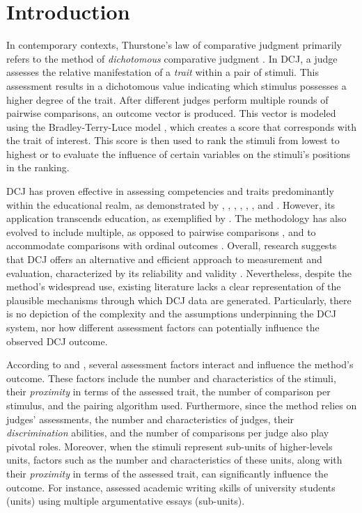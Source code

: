 \documentclass[
  authoryear,
  preprint,
  1p]{elsarticle}
\begin{document}
\section{Introduction}\label{sec-introduction}

In contemporary contexts, Thurstone's law of comparative judgment
\citeyearpar{Thurstone_1927} primarily refers to the method of
\emph{dichotomous} comparative judgment
\citep[DCJ,][]{Pollitt_2012a, Pollitt_2012b}. In DCJ, a judge assesses
the relative manifestation of a \emph{trait} within a pair of stimuli.
This assessment results in a dichotomous value indicating which stimulus
possesses a higher degree of the trait. After different judges perform
multiple rounds of pairwise comparisons, an outcome vector is produced.
This vector is modeled using the Bradley-Terry-Luce model
\citep[BTL,][]{Bradley_et_al_1952, Luce_1959}, which creates a score
that corresponds with the trait of interest. This score is then used to
rank the stimuli from lowest to highest or to evaluate the influence of
certain variables on the stimuli's positions in the ranking.

DCJ has proven effective in assessing competencies and traits
predominantly within the educational realm, as demonstrated by
\citet{Pollitt_2012b}, \citet{Jones_2015}, \citet{vanDaal_et_al_2016},
\citet{Bartholomew_et_al_2018}, \citet{Lesterhuis_2018},
\citet{Bartholomew_et_al_2020}, and \citet{Marshall_et_al_2020}.
However, its application transcends education, as exemplified by
\citet{Boonen_et_al_2020}. The methodology has also evolved to include
multiple, as opposed to pairwise comparisons
\citep{Luce_1959, Placket_1975}, and to accommodate comparisons with
ordinal outcomes \citep{Tutz_1986, Agresti_1992}. Overall, research
suggests that DCJ offers an alternative and efficient approach to
measurement and evaluation, characterized by its reliability and
validity \citep{Lesterhuis_2018, vanDaal_2020, Marshall_et_al_2020}.
Nevertheless, despite the method's widespread use, existing literature
lacks a clear representation of the plausible mechanisms through which
DCJ data are generated. Particularly, there is no depiction of the
complexity and the assumptions underpinning the DCJ system, nor how
different assessment factors can potentially influence the observed DCJ
outcome.

According to \citet{Verhavert_et_al_2019} and \citet{vanDaal_2020},
several assessment factors interact and influence the method's outcome.
These factors include the number and characteristics of the stimuli,
their \emph{proximity} in terms of the assessed trait, the number of
comparison per stimulus, and the pairing algorithm used. Furthermore,
since the method relies on judges' assessments, the number and
characteristics of judges, their \emph{discrimination} abilities, and
the number of comparisons per judge also play pivotal roles. Moreover,
when the stimuli represent sub-units of higher-levels units, factors
such as the number and characteristics of these units, along with their
\emph{proximity} in terms of the assessed trait, can significantly
influence the outcome. For instance, \citet{vanDaal_et_al_2016} assessed
academic writing skills of university students (units) using multiple
argumentative essays (sub-units).
\end{document}
